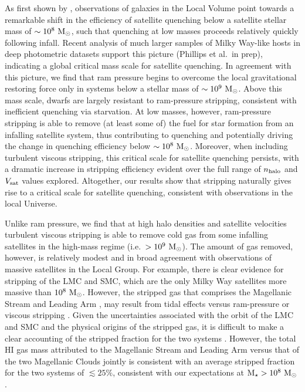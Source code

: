 As first shown by \citet[][see also \citealt{slater14,
  phillips15a}]{wheeler14}, observations of galaxies in the Local
Volume point towards a remarkable shift in the efficiency of satellite
quenching below a satellite stellar mass of $\sim10^{8}~{\rm M}_{\odot}$, such
that quenching at low masses proceeds relatively quickly following
infall.
%
Recent analysis of much larger samples of Milky Way-like hosts in deep
photometric datasets support this picture (Phillips et al.~in prep),
indicating a global critical mass scale for satellite quenching.
%
In agreement with this picture, we find that ram pressure begins to
overcome the local gravitational restoring force only in systems below
a stellar mass of $\sim10^{9}~{\rm M}_{\odot}$.
%
Above this mass scale, dwarfs are largely resistant to ram-pressure
stripping, consistent with inefficient quenching via starvation.
%
At low masses, however, ram-pressure stripping is able to remove (at
least some of) the fuel for star formation from an infalling satellite
system, thus contributing to quenching and potentially driving the
change in quenching efficiency below $\sim10^{8}~{\rm M}_{\odot}$.
%
Moreover, when including turbulent viscous stripping, this critical
scale for satellite quenching persists, with a dramatic increase in
stripping efficiency evident over the full range of $n_{\rm halo}$ and
$V_{\rm sat}$ values explored. 
%
Altogether, our results show that stripping naturally gives rise to a
critical scale for satellite quenching, consistent with observations
in the local Universe.


Unlike ram pressure, we find that at high halo densities and satellite
velocities turbulent viscous stripping is able to remove cold gas from
some infalling satellites in the high-mass regime
(i.e.~$>10^{9}~{\rm M}_{\odot}$). 
%
The amount of gas removed, however, is relatively modest and in broad
agreement with observations of massive satellites in the Local Group.
%
For example, there is clear evidence for stripping of the LMC and SMC,
which are the only Milky Way satellites more massive than
$10^{8}~{\rm M}_{\odot}$. However, the stripped gas that comprises the
Magellanic Stream and Leading Arm \citep{mathewson74}, may result from
tidal effects \citep[e.g.][]{lin77, besla10, besla12, guglielmo14}
versus ram-pressure or viscous stripping \citep[e.g.][]{md94,
  mastropietro05, salem15, hammer15}.
%
Given the uncertainties associated with the orbit of the LMC and SMC
and the physical origins of the stripped gas, it is difficult to make
a clear accounting of the stripped fraction for the two systems 
\citep[e.g.][]{donghia15}. However, the total H{\scriptsize I} gas
mass attributed to the Magellanic Stream and Leading Arm versus that
of the two Magellanic Clouds jointly is consistent with an average
stripped fraction for the two systems of $\lesssim25\%$, consistent
with our expectations at ${\rm M}_{\star}>10^{8}~{\rm M}_{\odot}$ \citep[see
Fig.~\ref{fig:MW_KH},][]{bruns05, nidever08, nidever10}.


